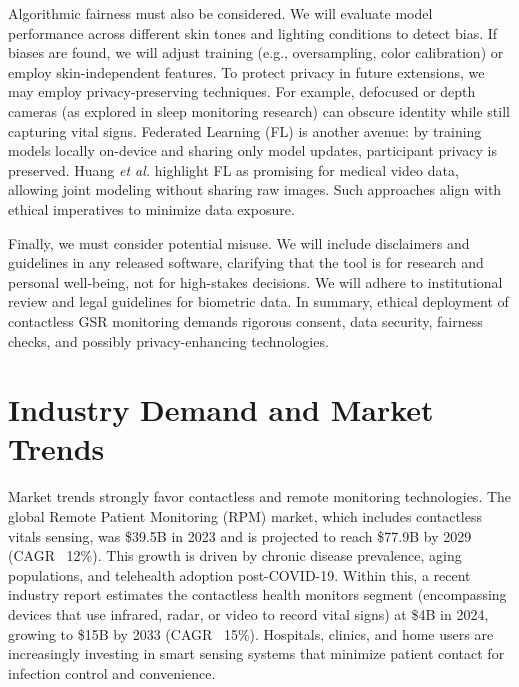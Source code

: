 \documentclass[12pt]{article}
\begin{document}
    Algorithmic fairness must also be considered. We will evaluate model performance across different skin tones and lighting conditions to detect bias. If biases are found, we will adjust training (e.g., oversampling, color calibration) or employ skin-independent features. To protect privacy in future extensions, we may employ privacy-preserving techniques. For example, defocused or depth cameras (as explored in sleep monitoring research) can obscure identity while still capturing vital signs. Federated Learning (FL) is another avenue: by training models locally on-device and sharing only model updates, participant privacy is preserved. Huang \emph{et al.} highlight FL as promising for medical video data, allowing joint modeling without sharing raw images. Such approaches align with ethical imperatives to minimize data exposure.

    Finally, we must consider potential misuse. We will include disclaimers and guidelines in any released software, clarifying that the tool is for research and personal well-being, not for high-stakes decisions. We will adhere to institutional review and legal guidelines for biometric data. In summary, ethical deployment of contactless GSR monitoring demands rigorous consent, data security, fairness checks, and possibly privacy-enhancing technologies.


    \section{Industry Demand and Market Trends}
    Market trends strongly favor contactless and remote monitoring technologies. The global Remote Patient Monitoring (RPM) market, which includes contactless vitals sensing, was \$39.5B in 2023 and is projected to reach \$77.9B by 2029 (CAGR ~12\%). This growth is driven by chronic disease prevalence, aging populations, and telehealth adoption post-COVID-19. Within this, a recent industry report estimates the contactless health monitors segment (encompassing devices that use infrared, radar, or video to record vital signs) at \$4B in 2024, growing to \$15B by 2033 (CAGR ~15\%). Hospitals, clinics, and home users are increasingly investing in smart sensing systems that minimize patient contact for infection control and convenience.
\end{document}
